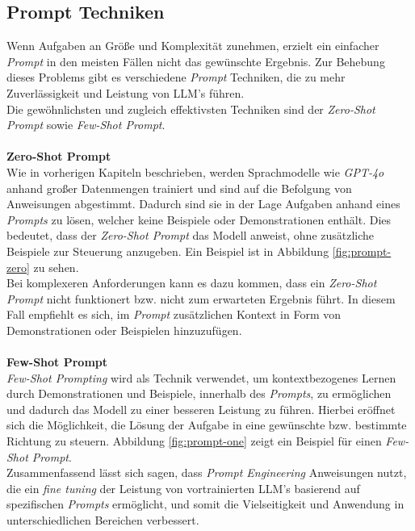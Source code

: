 \subsection{Prompt Techniken}
Wenn Aufgaben an Größe und Komplexität zunehmen, erzielt ein einfacher \textit{Prompt} in den meisten Fällen nicht das gewünschte Ergebnis. Zur Behebung dieses Problems gibt es verschiedene \textit{Prompt} Techniken, die zu mehr Zuverlässigkeit und Leistung von LLM's führen.\\ Die gewöhnlichsten und zugleich effektivsten Techniken sind der \textit{Zero-Shot Prompt} sowie \textit{Few-Shot Prompt}. \cite*{PromptEngineeringGuide}\\\\
\textbf{Zero-Shot Prompt}\\[0.2cm]
Wie in vorherigen Kapiteln beschrieben, werden Sprachmodelle wie \textit{GPT-4o} anhand großer Datenmengen trainiert und sind auf die Befolgung von Anweisungen abgestimmt. Dadurch sind sie in der Lage Aufgaben anhand eines \textit{Prompts} zu lösen, welcher keine Beispiele oder Demonstrationen enthält. Dies bedeutet, dass der \textit{Zero-Shot Prompt} das Modell anweist, ohne zusätzliche Beispiele zur Steuerung anzugeben. Ein Beispiel ist in Abbildung \ref{fig:prompt-zero} zu sehen.\\Bei komplexeren Anforderungen kann es dazu kommen, dass ein \textit{Zero-Shot Prompt} nicht funktionert bzw. nicht zum erwarteten Ergebnis führt. In diesem Fall empfiehlt es sich, im \textit{Prompt} zusätzlichen Kontext in Form von Demonstrationen oder Beispielen hinzuzufügen. \cite{PromptEngineeringGuide}\\\\
\textbf{Few-Shot Prompt}\\[0.2cm]
\textit{Few-Shot Prompting} wird als Technik verwendet, um kontextbezogenes Lernen durch Demonstrationen und Beispiele, innerhalb des \textit{Prompts}, zu ermöglichen und dadurch das Modell zu einer besseren Leistung zu führen. Hierbei eröffnet sich die Möglichkeit, die Lösung der Aufgabe in eine gewünschte bzw. bestimmte Richtung zu steuern. Abbildung \ref{fig:prompt-one} zeigt ein Beispiel für einen \textit{Few-Shot Prompt}. \\
Zusammenfassend lässt sich sagen, dass \textit{Prompt Engineering} Anweisungen nutzt, die ein \textit{fine tuning} der Leistung von vortrainierten LLM's basierend auf spezifischen \textit{Prompts} ermöglicht, und somit die Vielseitigkeit und Anwendung in unterschiedlichen Bereichen verbessert. \cite*{sahooSystematicSurveyPrompt2024}


